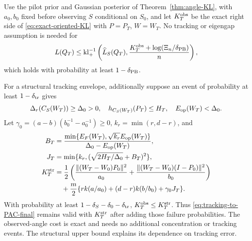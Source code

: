 \begin{theorem}
\label{thm:tracking-PAC}
Use the pilot prior and Gaussian posterior of Theorem~\ref{thm:angle-KL},
with $a_0,b_0$ fixed before observing $S$ conditional on $S_0$, and let
$K_T^{\rm obs}$ be the exact right side of \eqref{eq:exact-oriented-KL}
with $P=P_T$, $W=W_T$. No tracking or eigengap assumption is needed for
\begin{equation}
 L(Q_T)\le\operatorname{kl}^{-1}_+\left(\widehat L_S(Q_T),
                  \frac{K_T^{\rm obs}+\log(\Xi_n/\delta_{\rm PB})}{n}\right),
 \label{eq:tracking-to-PAC-final}
\end{equation}
which holds with probability at least $1-\delta_{\rm PB}$.

For a structural tracking envelope, additionally suppose an event of
probability at least $1-\delta_{\rm tr}$ gives
\begin{equation}
 \Delta_r(C_S(W_T))\ge\Delta_0>0,\quad
 h_{C_S(W_T)}(P_T)\le H_T,\quad E_{\rm op}(W_T)<\Delta_0.
 \label{eq:tracking-pilot-conditions}
\end{equation}
Let $\gamma_0=(a-b)(b_0^{-1}-a_0^{-1})\ge0$, $k_r=\min(r,d-r)$, and
\begin{align}
 B_T&=\frac{\min\{E_F(W_T),\sqrt{k_r}E_{\rm op}(W_T)\}}
                    {\Delta_0-E_{\rm op}(W_T)},\\
 J_T&=\min\{k_r,(\sqrt{2H_T/\Delta_0}+B_T)^2\},\\
 K_T^{\rm str}&=\frac12\left(\frac{\|(W_T-W_0)P_0\|^2}{a_0}
       +\frac{\|(W_T-W_0)(I-P_0)\|^2}{b_0}\right)\notag\\
 &\quad+\frac m2\{rk(a/a_0)+(d-r)k(b/b_0)+\gamma_0J_T\}.
\end{align}
With probability at least $1-\delta_S-\delta_0-\delta_{\rm tr}$,
$K_T^{\rm obs}\le K_T^{\rm str}$. Thus \eqref{eq:tracking-to-PAC-final}
remains valid with $K_T^{\rm str}$ after adding those failure probabilities.
The observed-angle cost is exact and needs no additional concentration or
tracking events. The structural upper bound explains its dependence on
tracking error.
\end{theorem}
